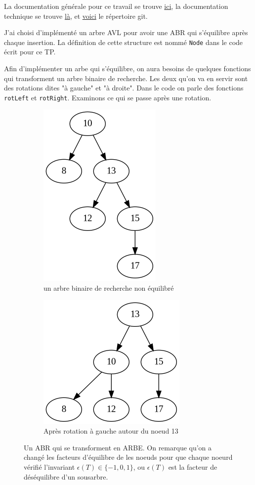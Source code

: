 \documentclass[10pt]{article} %
\begin{document}
\vspace{1cm}

La documentation générale pour ce travail se trouve \href{https://polytech-sorbonne-main-tp2.readthedocs.io/en/latest/}{ici}, la documentation
technique se trouve \href{https://ejovo13.github.io/DSA_TP1/}{là}, et \href{https://github.com/ejovo13/DSA_TP1}{voici} le répertoire git.

\vspace{1cm}
\noindent {} 

J'ai choisi d'implémenté un arbre AVL pour avoir une ABR qui s'équilibre après chaque insertion. La définition de cette structure est nommé \texttt{Node} dans le
code écrit pour ce TP.

Afin d'implémenter un arbe qui s'équilibre, on aura besoins de quelques fonctions qui transforment un arbre binaire de recherche. Les deux qu'on va en servir sont des
rotations dites "à gauche" et "à droite". Dans le code on parle des fonctions \texttt{rotLeft} et \texttt{rotRight}. Examinons ce qui se passe après une rotation.

\begin{figure}[h!]
    \centering
    \begin{subfigure}{.5\textwidth}
      \centering
      \includegraphics[height=.4\linewidth]{media/tex_1.png}
      \caption{un arbre binaire de recherche non équilibré}
      \label{fig:sub1}
    \end{subfigure}%
    \begin{subfigure}{.5\textwidth}
      \centering
      \includegraphics[width=.4\linewidth]{media/tex_1_rot.png}
      \caption{Après rotation à gauche autour du noeud 13}
      \label{fig:sub2}
    \end{subfigure}
    \caption{Un ABR qui se transforment en ARBE. On remarque qu'on a changé les facteurs d'équilibre de les noeuds pour que chaque noeurd vérifié
    l'invariant $\epsilon(T) \in \{-1, 0, 1\}$, ou $\epsilon(T)$ est la facteur de déséquilibre d'un sousarbre.}
    \label{fig:test}
    \end{figure}
\end{document}
